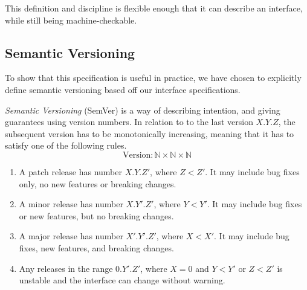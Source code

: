 This definition and discipline is flexible enough that it can describe
an interface, while still being machine-checkable.






\subsection{Semantic Versioning} \label{sec:semver}

To show that this specification is useful in practice, we have chosen
to explicitly define semantic versioning based off our interface
specifications.

\begin{definition}\textit{Semantic Versioning} (SemVer) is a way of describing
intention, and giving guarantees using version numbers\cite{semver}.
In relation to to the last version $X.Y.Z$, the subsequent version has to be
monotonically increasing, meaning that it has to satisfy one of the
following rules.
$$ \text{Version} : \mathbb{N} \times \mathbb{N} \times \mathbb{N} $$

\begin{enumerate}
    \item A patch release has number $X.Y.Z'$, where $Z < Z'$. It may include
    bug fixes only, no new features or breaking changes.
    
    \item A minor release has number $X.Y'.Z'$, where $Y < Y'$. It may include
    bug fixes or new features, but no breaking changes.
    
    \item A major release has number $X'.Y'.Z'$, where $X < X'$. It may include
    bug fixes, new features, and breaking changes.
    
    \item Any releases in the range $0.Y'.Z'$, where $X = 0$ and $Y < Y'$ or $Z
    < Z'$ is unstable and the interface can change without warning.
\end{enumerate}

\end{definition}

